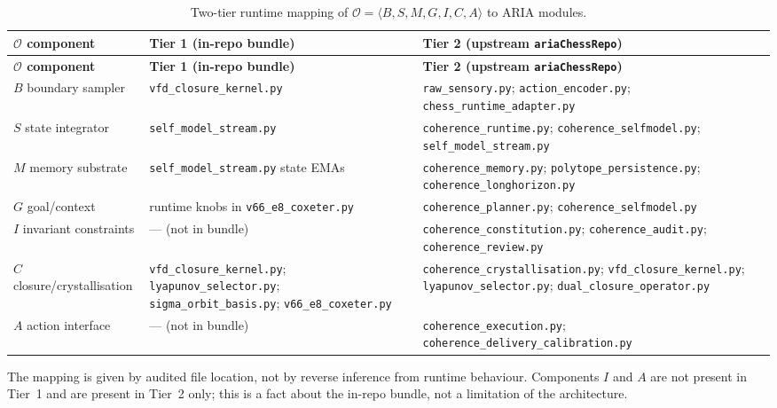 \documentclass[11pt]{article}
\theoremstyle{definition}
\newcommand{\Ocal}{\mathcal{O}}
\begin{document}
\renewcommand{\arraystretch}{1.30}
\begin{longtable}{>{\raggedright\arraybackslash}p{}>{\raggedright\arraybackslash}p{}>{\raggedright\arraybackslash}p{}}
\caption{Two-tier runtime mapping of $\Ocal = \langle B, S, M, G, I, C, A\rangle$
to ARIA modules.}\label{tab:runtime-map}\\
\toprule
\textbf{$\Ocal$ component} & \textbf{Tier 1 (in-repo bundle)} & \textbf{Tier 2 (upstream \texttt{ariaChessRepo})} \\
\midrule
\endfirsthead
\toprule
\textbf{$\Ocal$ component} & \textbf{Tier 1 (in-repo bundle)} & \textbf{Tier 2 (upstream \texttt{ariaChessRepo})} \\
\midrule
\endhead
$B$ boundary sampler
& \texttt{vfd\_closure\_kernel.py}
& \texttt{raw\_sensory.py}; \texttt{action\_encoder.py}; \texttt{chess\_runtime\_adapter.py}\\
$S$ state integrator
& \texttt{self\_model\_stream.py}
& \texttt{coherence\_runtime.py}; \texttt{coherence\_selfmodel.py}; \texttt{self\_model\_stream.py}\\
$M$ memory substrate
& \texttt{self\_model\_stream.py} state EMAs
& \texttt{coherence\_memory.py}; \texttt{polytope\_persistence.py}; \texttt{coherence\_longhorizon.py}\\
$G$ goal/context
& runtime knobs in \texttt{v66\_e8\_coxeter.py}
& \texttt{coherence\_planner.py}; \texttt{coherence\_selfmodel.py}\\
$I$ invariant constraints
& --- (not in bundle)
& \texttt{coherence\_constitution.py}; \texttt{coherence\_audit.py}; \texttt{coherence\_review.py}\\
$C$ closure/crystallisation
& \texttt{vfd\_closure\_kernel.py}; \texttt{lyapunov\_selector.py}; \texttt{sigma\_orbit\_basis.py}; \texttt{v66\_e8\_coxeter.py}
& \texttt{coherence\_crystallisation.py}; \texttt{vfd\_closure\_kernel.py}; \texttt{lyapunov\_selector.py}; \texttt{dual\_closure\_operator.py}\\
$A$ action interface
& --- (not in bundle)
& \texttt{coherence\_execution.py}; \texttt{coherence\_delivery\_calibration.py}\\
\bottomrule
\end{longtable}

The mapping is given by audited file location, not by reverse
inference from runtime behaviour. Components $I$ and $A$ are not
present in Tier~1 and are present in Tier~2 only; this is a fact
about the in-repo bundle, not a limitation of the architecture.
\end{document}
